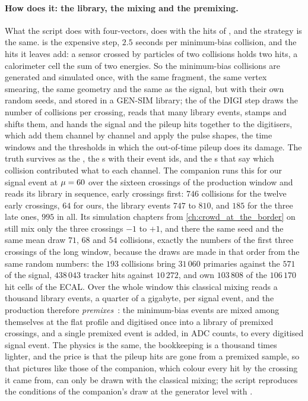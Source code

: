 \paragraph{How \CMSSW does it: the library, the mixing and the premixing.}
\label{sec:crowd_on_the_road:how_cms_mixes_pileup_into_simulation_the}
What the script does with four-vectors, \CMSSW does with the hits of
\GEANT, and the strategy is the same. \GEANT is the expensive step,
$2.5$ seconds per minimum-bias collision, and the hits it leaves add: a
sensor crossed by particles of two collisions holds two hits, a
calorimeter cell the sum of two energies. So the minimum-bias collisions
are generated and simulated once, with the same fragment, the same vertex
smearing, the same geometry and the same \GEANT as the signal, but with
their own random seeds, and stored in a GEN-SIM library; the \Mix of the
DIGI step draws the number of collisions per crossing, reads that many
library events, stamps and shifts them, and hands the signal and the
pileup hits together to the digitisers, which add them channel by
channel and apply the pulse shapes, the time windows and the thresholds
in which the out-of-time pileup does its damage. The truth survives as
the , the s with their
event ids, and the s that say which collision
contributed what to each channel. The companion runs this \Mix for our
signal event at $\mu=60$ over the sixteen crossings of the production
window and reads its library in sequence, early crossings first: $746$
collisions for the twelve early crossings, $64$ for ours, the library
events $747$ to $810$, and $185$ for the three late ones, $995$ in all.
Its simulation chapters from \cref{ch:crowd_at_the_border} on still mix only the three crossings $-1$ to $+1$,
and there the same seed and the same mean draw $71$, $68$ and $54$
collisions, exactly the numbers of the first three crossings of the long
window, because the draws are made in that order from the same random
numbers: the $193$ collisions bring $31\,060$ primaries against the $571$
of the signal, $438\,043$ tracker hits against $10\,272$, and own
$103\,808$ of the $106\,170$ hit cells of the ECAL. Over the whole
window this classical mixing reads a thousand library events, a quarter
of a gigabyte, per signal event, and the production therefore
\emph{premixes}~\cite{Hildreth:2017caz}: the minimum-bias events are
mixed among themselves at the flat profile and digitised once into a
library of premixed crossings, and a single premixed event is added, in
ADC counts, to every digitised signal event. The physics is the same,
the bookkeeping is a thousand times lighter, and the price is that the
pileup hits are gone from a premixed sample, so that pictures like those
of the companion, which colour every hit by the crossing it came from,
can only be drawn with the classical mixing; the script reproduces the
conditions of the companion's draw at the generator level with
.


